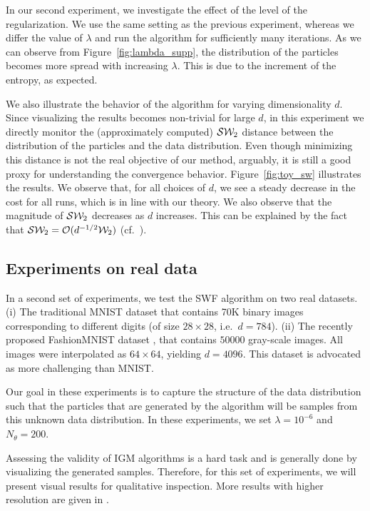In our second experiment, we investigate the effect of the level of the regularization. We use the same setting as the previous experiment, whereas we differ the value of $\lambda$ and run the algorithm for sufficiently many iterations. As we can observe from Figure~\ref{fig:lambda_supp}, the distribution of the particles becomes more spread with increasing $\lambda$. This is due to the increment of the entropy, as expected.



We also illustrate the behavior of the algorithm for varying dimensionality $d$. Since visualizing the results becomes non-trivial for large $d$, in this experiment we directly monitor the (approximately computed) ${\cal S}{\cal W}_2$ distance between the distribution of the particles and the data distribution. Even though minimizing this distance is not the real objective of our method, arguably, it is still a good proxy for understanding the convergence behavior.
%
Figure~\ref{fig:toy_sw} illustrates the results. We observe that, for all choices of $d$, we see a steady decrease in the cost for all runs, which is in line with our theory. We also observe that the magnitude of ${\cal S}{\cal W}_2$ decreases as $d$ increases. This can be explained by the fact that ${\cal S}{\cal W}_2 = {\cal O}(d^{-1/2}{\cal W}_2)$ (cf.\ \cite{bonnotte2013unidimensional}).






\subsection{Experiments on real data}

%
In a second set of experiments, we test the SWF algorithm on two real datasets. (i) The traditional MNIST dataset that contains 70K binary images corresponding to different digits (of size $28 \times 28$, i.e.\ $d = 784$). (ii) The recently proposed FashionMNIST dataset \cite{xiao2017fashion}, that contains $50000$ gray-scale images. All images were interpolated as $64\times 64$, yielding $d=4096$. This dataset is advocated as more challenging than MNIST.

Our goal in these experiments is to capture the structure of the data distribution such that the particles that are generated by the algorithm will be samples from this unknown data distribution. In these experiments, we set $\lambda=10^{-6}$ and $N_\theta=200$. 

Assessing the validity of IGM algorithms is a hard task and is generally done by visualizing the generated samples. Therefore, for this set of experiments, we will present visual results for qualitative inspection. More results with higher resolution are given in \supp{}.


